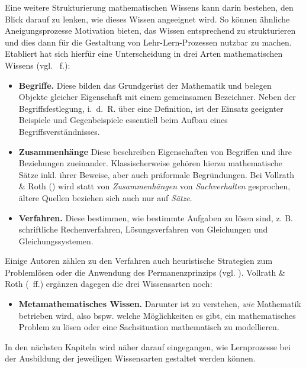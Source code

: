 \documentclass[
]{scrbook}
\providecommand{\tightlist}{%
  \setlength{\itemsep}{0pt}\setlength{\parskip}{0pt}}
\theoremstyle{definition}
\theoremstyle{definition}
\theoremstyle{definition}
\theoremstyle{definition}
\theoremstyle{remark}
\begin{document}
Eine weitere Strukturierung mathematischen Wissens kann darin bestehen, den Blick darauf zu lenken, wie dieses Wissen angeeignet wird. So können ähnliche Aneigungsprozesse Motivation bieten, das Wissen entsprechend zu strukturieren und dies dann für die Gestaltung von Lehr-Lern-Prozessen nutzbar zu machen. Etabliert hat sich hierfür eine Unterscheidung in drei Arten mathematischen Wissens (vgl. ~f.):

\begin{itemize}
\item
  \textbf{Begriffe.} Diese bilden das Grundgerüst der Mathematik und belegen Objekte gleicher Eigenschaft mit einem gemeinsamen Bezeichner. Neben der Begriffsfestlegung, i.~d.~R. über eine Definition, ist der Einsatz geeignter Beispiele und Gegenbeispiele essentiell beim Aufbau eines Begriffsverständnisses.
\item
  \textbf{Zusammenhänge} Diese beschreiben Eigenschaften von Begriffen und ihre Beziehungen zueinander. Klassischerweise gehören hierzu mathematische Sätze inkl. ihrer Beweise, aber auch präformale Begründungen. Bei Vollrath \& Roth () wird statt von \emph{Zusammenhängen} von \emph{Sachverhalten} gesprochen, ältere Quellen beziehen sich auch nur auf \emph{Sätze}.
\item
  \textbf{Verfahren.} Diese bestimmen, wie bestimmte Aufgaben zu lösen sind, z. B. schriftliche Rechenverfahren, Lösungsverfahren von Gleichungen und Gleichungssystemen.
\end{itemize}

Einige Autoren zählen zu den Verfahren auch heuristische Strategien zum Problemlösen oder die Anwendung des Permanenzprinzips (vgl. ). Vollrath \& Roth (~ff.) ergänzen dagegen die drei Wissensarten noch:

\begin{itemize}
\tightlist
\item
  \textbf{Metamathematisches Wissen.} Darunter ist zu verstehen, \emph{wie} Mathematik betrieben wird, also bspw. welche Möglichkeiten es gibt, ein mathematisches Problem zu lösen oder eine Sachsituation mathematisch zu modellieren.
\end{itemize}

In den nächsten Kapiteln wird näher darauf eingegangen, wie Lernprozesse bei der Ausbildung der jeweiligen Wissensarten gestaltet werden können.
\end{document}

